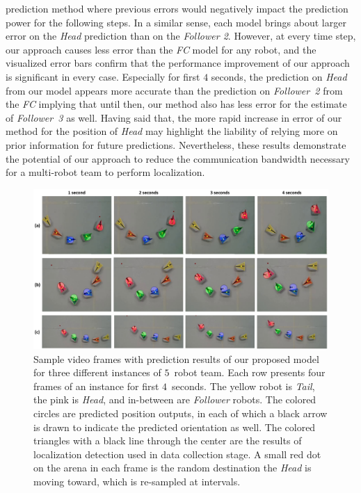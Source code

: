 \documentclass[letterpaper, 10 pt, conference]{ieeeconf}  %
\begin{document}
    prediction method where previous errors would negatively impact the
    prediction power for the following steps. In a similar sense, each
    model brings about larger error on the \emph{Head} prediction than
    on the \emph{Follower 2}. However, at every time step, our approach
    causes less error than the \emph{FC} model for any robot, and the
    visualized error bars confirm that the performance improvement of
    our approach is significant in every case. Especially for first $4$
    seconds, the prediction on \emph{Head} from our model appears more
    accurate than the prediction on \emph{Follower~2} from the \emph{FC}
    implying that until then, our method also has less error for the
    estimate of \emph{Follower~3} as well. Having said that, the more
    rapid increase in error of our method for the position of
    \emph{Head} may highlight the liability of relying more on prior
    information for future predictions. Nevertheless, these results
    demonstrate the potential of our approach to reduce the
    communication bandwidth necessary for a multi-robot team to perform
    localization.
    \begin{figure}[t]
    	\centering
    	\includegraphics[width=2.\columnwidth]{fig_preds}
    	\caption{Sample video frames with prediction results of our proposed model
    		for three different instances of $5$~robot team.
    		Each row presents four frames of an instance for first $4$~seconds.
    		The yellow robot is \emph{Tail}, the pink is \emph{Head}, and
    		in-between are \emph{Follower} robots.
    		The colored circles are predicted position outputs, in each
    		of which a black arrow is drawn to indicate the predicted orientation as well.
    		The colored triangles with a black line through the center are the
    		results of localization detection used in data collection stage.
    		A small red dot on the arena in each frame is the random destination the
    		\emph{Head} is moving toward, which is re-sampled at intervals.
    	}
    	\label{fig:preds}
    \end{figure}
\end{document}
